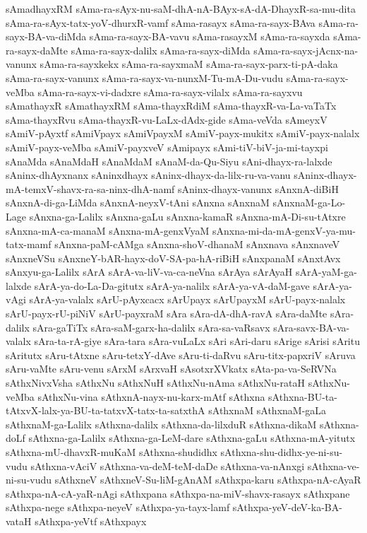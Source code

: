 {sAmadhayxRM
sAma-ra-sAyx-nu-saM-dhA-nA-BAyx-sA-dA-DhayxR-sa-mu-dita
sAma-ra-sAyx-tatx-yoV-dhurxR-vamf
sAma-rasayx
sAma-ra-sayx-BAva
sAma-ra-sayx-BA-va-diMda
sAma-ra-sayx-BA-vavu
sAma-rasayxM
sAma-ra-sayxda
sAma-ra-sayx-daMte
sAma-ra-sayx-dalilx
sAma-ra-sayx-diMda
sAma-ra-sayx-jAcnx-na-vanunx
sAma-ra-sayxkekx
sAma-ra-sayxmaM
sAma-ra-sayx-parx-ti-pA-daka
sAma-ra-sayx-vanunx
sAma-ra-sayx-va-nunxM-Tu-mA-Du-vudu
sAma-ra-sayx-veMba
sAma-ra-sayx-vi-dadxre
sAma-ra-sayx-vilalx
sAma-ra-sayxvu
sAmathayxR
sAmathayxRM
sAma-thayxRdiM
sAma-thayxR-va-La-vaTaTx
sAma-thayxRvu
sAma-thayxR-vu-LaLx-dAdx-gide
sAma-veVda
sAmeyxV
sAmiV-pAyxtf
sAmiVpayx
sAmiVpayxM
sAmiV-payx-mukitx
sAmiV-payx-nalalx
sAmiV-payx-veMba
sAmiV-payxveV
sAmipayx
sAmi-tiV-biV-ja-mi-tayxpi
sAnaMda
sAnaMdaH
sAnaMdaM
sAnaM-da-Qu-Siyu
sAni-dhayx-ra-lalxde
sAninx-dhAyxnanx
sAninxdhayx
sAninx-dhayx-da-lilx-ru-va-vanu
sAninx-dhayx-mA-temxV-shavx-ra-sa-ninx-dhA-namf
sAninx-dhayx-vanunx
sAnxnA-diBiH
sAnxnA-di-ga-LiMda
sAnxnA-neyxV-tAni
sAnxna
sAnxnaM
sAnxnaM-ga-Lo-Lage
sAnxna-ga-Lalilx
sAnxna-gaLu
sAnxna-kamaR
sAnxna-mA-Di-su-tAtxre
sAnxna-mA-ca-manaM
sAnxna-mA-genxVyaM
sAnxna-mi-da-mA-genxV-ya-mu-tatx-mamf
sAnxna-paM-cAMga
sAnxna-shoV-dhanaM
sAnxnava
sAnxnaveV
sAnxneVSu
sAnxneY-bAR-hayx-doV-SA-pa-hA-riBiH
sAnxpanaM
sAnxtAvx
sAnxyu-ga-Lalilx
sArA
sArA-va-liV-va-ca-neVna
sArAya
sArAyaH
sArA-yaM-ga-lalxde
sArA-ya-do-La-Da-gitutx
sArA-ya-nalilx
sArA-ya-vA-daM-gave
sArA-ya-vAgi
sArA-ya-valalx
sArU-pAyxcacx
sArUpayx
sArUpayxM
sArU-payx-nalalx
sArU-payx-rU-piNiV
sArU-payxraM
sAra
sAra-dA-dhA-ravA
sAra-daMte
sAra-dalilx
sAra-gaTiTx
sAra-saM-garx-ha-dalilx
sAra-sa-vaRsavx
sAra-savx-BA-va-valalx
sAra-ta-rA-giye
sAra-tara
sAra-vuLaLx
sAri
sAri-daru
sArige
sArisi
sAritu
sAritutx
sAru-tAtxne
sAru-tetxY-dAve
sAru-ti-daRvu
sAru-titx-papxriV
sAruva
sAru-vaMte
sAru-venu
sArxM
sArxvaH
sAsotxrXVkatx
sAta-pa-va-SeRVNa
sAthxNivxVsha
sAthxNu
sAthxNuH
sAthxNu-nAma
sAthxNu-rataH
sAthxNu-veMba
sAthxNu-vina
sAthxnA-nayx-nu-karx-mAtf
sAthxna
sAthxna-BU-ta-tAtxvX-lalx-ya-BU-ta-tatxvX-tatx-ta-satxthA
sAthxnaM
sAthxnaM-gaLa
sAthxnaM-ga-Lalilx
sAthxna-dalilx
sAthxna-da-lilxduR
sAthxna-dikaM
sAthxna-doLf
sAthxna-ga-Lalilx
sAthxna-ga-LeM-dare
sAthxna-gaLu
sAthxna-mA-yitutx
sAthxna-mU-dhavxR-muKaM
sAthxna-shudidhx
sAthxna-shu-didhx-ye-ni-su-vudu
sAthxna-vAciV
sAthxna-va-deM-teM-daDe
sAthxna-va-nAnxgi
sAthxna-ve-ni-su-vudu
sAthxneV
sAthxneV-Su-liM-gAnAM
sAthxpa-karu
sAthxpa-nA-cAyaR
sAthxpa-nA-cA-yaR-nAgi
sAthxpana
sAthxpa-na-miV-shavx-rasayx
sAthxpane
sAthxpa-nege
sAthxpa-neyeV
sAthxpa-ya-tayx-lamf
sAthxpa-yeV-deV-ka-BA-vataH
sAthxpa-yeVtf
sAthxpayx
}
